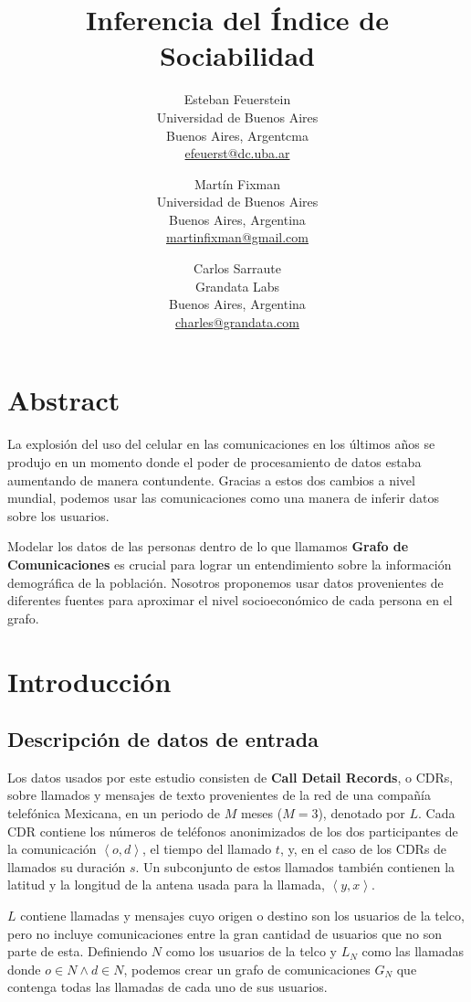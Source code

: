 \documentclass[
10pt,
spanish,
singlespacing, %
parskip, %
headsepline, %
twocolumn
]{article} %
\title{Inferencia del Índice de Sociabilidad}
\author{
	\hspace{-1.725cm} Esteban Feuerstein\\
	\hspace{-1.725cm} Universidad de Buenos Aires\\
	\hspace{-1.725cm} Buenos Aires, Argentcma\\
	\hspace{-1.725cm} \url{efeuerst@dc.uba.ar}
	\and
	Martín Fixman\\
	Universidad de Buenos Aires\\
	Buenos Aires, Argentina\\
	\url{martinfixman@gmail.com}
	\and
	Carlos Sarraute\\
	Grandata Labs\\
	Buenos Aires, Argentina\\
	\url{charles@grandata.com}
}
\date{}
\begin{document}
\maketitle

\section{Abstract}

La explosión del uso del celular en las comunicaciones en los últimos años se produjo en un momento donde el poder de procesamiento de datos estaba aumentando de manera contundente. Gracias a estos dos cambios a nivel mundial, podemos usar las comunicaciones como una manera de inferir datos sobre los usuarios.

Modelar los datos de las personas dentro de lo que llamamos \textbf{Grafo de Comunicaciones} es crucial para lograr un entendimiento sobre la información demográfica de la población. Nosotros proponemos usar datos provenientes de diferentes fuentes para aproximar el nivel socioeconómico de cada persona en el grafo.

\section{Introducción}


\subsection{Descripción de datos de entrada}

Los datos usados por este estudio consisten de \textbf{Call Detail Records}, o CDRs, sobre llamados y mensajes de texto provenientes de la red de una compañía telefónica Mexicana, en un periodo de \( M \) meses (\( M = 3 \)), denotado por \( L \). Cada CDR contiene los números de teléfonos anonimizados de los dos participantes de la comunicación \(\left<o, d\right>\), el tiempo del llamado \(t\), y, en el caso de los CDRs de llamados su duración \(s\). Un subconjunto de estos llamados también contienen la latitud y la longitud de la antena usada para la llamada, \(\left<y, x\right>\).

\( L \) contiene llamadas y mensajes cuyo origen o destino son los usuarios de la telco, pero no incluye comunicaciones entre la gran cantidad de usuarios que no son parte de esta. Definiendo \( N \) como los usuarios de la telco y \( L_N \) como las llamadas donde \( o \in N \wedge d \in N \), podemos crear un grafo de comunicaciones \( G_N \) que contenga todas las llamadas de cada uno de sus usuarios.
\end{document}
